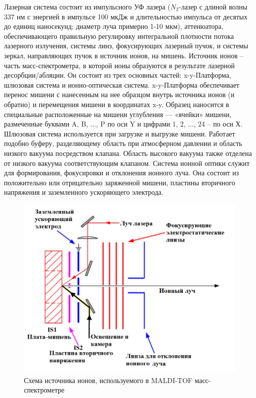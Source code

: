 \documentclass{article}
\begin{document}
Лазерная система состоит из импульсного УФ лазера ($N_2$-лазер с длиной волны 337 нм с энергией в импульсе 100 мкДж и длительностью импульса от десятых до единиц наносекунд; диаметр луча примерно 1-10 мкм), аттенюатора, обеспечивающего правильную регулировку
интегральной плотности потока лазерного излучения, системы линз, фокусирующих лазерный пучок, и системы зеркал, направляющих пучок в источник ионов, на мишень.
Источник ионов – часть масс-спектрометра, в которой ионы образуются в результате лазерной десорбции/абляции. Он состоит из трех основных частей: x-y-Платформа,
шлюзовая система и ионно-оптическая система.
x-y-Платформа обеспечивает перенос мишени с нанесенным на нее образцом внутрь источника ионов (и обратно) и перемещения мишени в координатах x-y. Образец наносится в специальные расположенные на мишени углубления — «ячейки» мишени, размеченные буквами A, B, ..., P по оси Y и цифрами 1, 2, ..., 24 – по оси Х.
Шлюзовая система используется при загрузке и выгрузке мишени. Работает подобно буферу, разделяющему область при атмосферном давлении и область низкого вакуума посредством клапана. Область высокого вакуума также отделена от низкого вакуума соответствующим клапаном.
Система ионной оптики служит для формирования, фокусировки и отклонения ионного луча. Она состоит из положительно или отрицательно заряженной мишени,
пластины вторичного напряжения и заземленного ускоряющего электрода.
 \begin{figure}[h!]
        \centering
        \includegraphics[scale=0.4]{Images/2025-01-18_23-20-44.png}
        \caption{Схема источника ионов, используемого в MALDI-TOF масс-спектрометре}
\end{figure}
\end{document}
